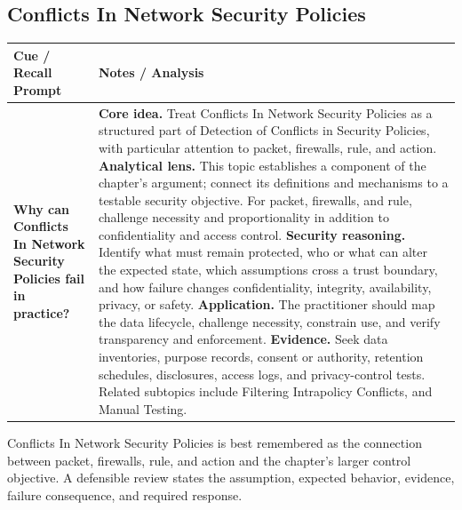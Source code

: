 \documentclass[11pt]{article}
\newcommand{\CornellHeader}{%
\rowcolor{Navy}\color{white}\bfseries Cue / Recall Prompt & \color{white}\bfseries Notes / Analysis\\\hline}
\newcommand{\CornellRow}[2]{%
\cellcolor{CueGray}\RaggedRight\textbf{#1} & \RaggedRight #2\\\hline}
\begin{document}
\subsection*{Conflicts In Network Security Policies}
\begin{longtable}{>{\RaggedRight\arraybackslash}p{}|>{\RaggedRight\arraybackslash}p{}}
\CornellHeader
\CornellRow{Why can Conflicts In Network Security Policies fail in practice?}{\textbf{Core idea.} Treat Conflicts In Network Security Policies as a structured part of Detection of Conflicts in Security Policies, with particular attention to packet, firewalls, rule, and action. \textbf{Analytical lens.} This topic establishes a component of the chapter's argument; connect its definitions and mechanisms to a testable security objective. For packet, firewalls, and rule, challenge necessity and proportionality in addition to confidentiality and access control. \textbf{Security reasoning.} Identify what must remain protected, who or what can alter the expected state, which assumptions cross a trust boundary, and how failure changes confidentiality, integrity, availability, privacy, or safety. \textbf{Application.} The practitioner should map the data lifecycle, challenge necessity, constrain use, and verify transparency and enforcement. \textbf{Evidence.} Seek data inventories, purpose records, consent or authority, retention schedules, disclosures, access logs, and privacy-control tests. Related subtopics include Filtering Intrapolicy Conflicts, and Manual Testing.}
\end{longtable}
\begin{topicsummary}
Conflicts In Network Security Policies is best remembered as the connection between packet, firewalls, rule, and action and the chapter's larger control objective. A defensible review states the assumption, expected behavior, evidence, failure consequence, and required response.
\end{topicsummary}
\end{document}
